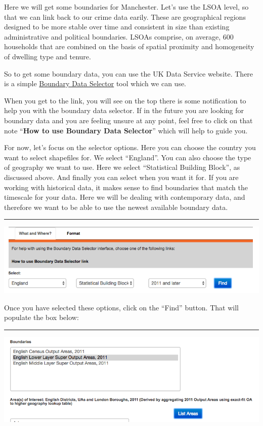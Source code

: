 \documentclass[
]{book}
\begin{document}
Here we will get some boundaries for Manchester. Let's use the LSOA level, so that we can link back to our crime data earily. These are geographical regions designed to be more stable over time and consistent in size than existing administrative and political boundaries. LSOAs comprise, on average, 600 households that are combined on the basis of spatial proximity and homogeneity of dwelling type and tenure.

So to get some boundary data, you can use the UK Data Service website. There is a simple \href{https://borders.ukdataservice.ac.uk/bds.html}{Boundary Data Selector} tool which we can use.

When you get to the link, you will see on the top there is some notification to help you with the boundary data selector. If in the future you are looking for boundary data and you are feeling unsure at any point, feel free to click on that note ``\textbf{How to use Boundary Data Selector}'' which will help to guide you.

For now, let's focus on the selector options. Here you can choose the country you want to select shapefiles for. We select ``England''. You can also choose the type of geography we want to use. Here we select ``Statistical Building Block'', as discussed above. And finally you can select when you want it for. If you are working with historical data, it makes sense to find boundaries that match the timescale for your data. Here we will be dealing with contemporary data, and therefore we want to be able to use the newest available boundary data.

\begin{center}\rule{0.5\linewidth}{0.5pt}\end{center}

\includegraphics{img/boundary_selector_1.png}

Once you have selected these options, click on the ``Find'' button. That will populate the box below:

\begin{center}\rule{0.5\linewidth}{0.5pt}\end{center}

\includegraphics{img/boundary_selector_2.png}
\end{document}

